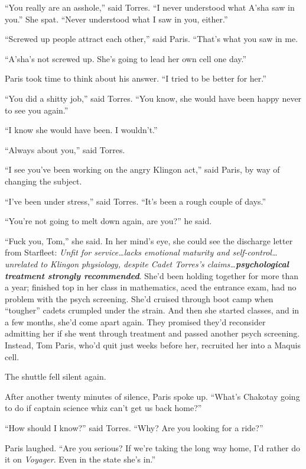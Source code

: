 \documentclass[twoside,letterpaper,12pt]{memoir}
\begin{document}
``You really are an asshole,'' said Torres. ``I never understood what A'sha saw in you.'' She spat. ``Never understood what I saw in you, either.''

``Screwed up people attract each other,'' said Paris. ``That's what you saw in me.

``A'sha's not screwed up. She's going to lead her own cell one day.''

Paris took time to think about his answer. ``I tried to be better for her.''

``You did a shitty job,'' said Torres. ``You know, she would have been happy never to see you again.''

``I know she would have been. I wouldn't.''

``Always about you,'' said Torres.

``I see you've been working on the angry Klingon act,'' said Paris, by way of changing the subject.

``I've been under stress,'' said Torres. ``It's been a rough couple of days.''

``You're not going to melt down again, are you?'' he said.

``Fuck you, Tom,'' she said. In her mind's eye, she could see the discharge letter from Starfleet: \textit{Unfit for service\ldots lacks emotional maturity and self-control\ldots unrelated to Klingon physiology, despite Cadet Torres's claims\ldots \textbf{psychological treatment strongly recommended}}. She'd been holding together for more than a year; finished top in her class in mathematics, aced the entrance exam, had no problem with the psych screening. She'd cruised through boot camp when ``tougher'' cadets crumpled under the strain. And then she started classes, and in a few months, she'd come apart again. They promised they'd reconsider admitting her if she went through treatment and passed another psych screening. Instead, Tom Paris, who'd quit just weeks before her, recruited her into a Maquis cell.

The shuttle fell silent again.

After another twenty minutes of silence, Paris spoke up. ``What's Chakotay going to do if captain science whiz can't get us back home?''

``How should I know?'' said Torres. ``Why? Are you looking for a ride?''

Paris laughed. ``Are you serious? If we're taking the long way home, I'd rather do it on \textit{Voyager}. Even in the state she's in.''
\end{document}
